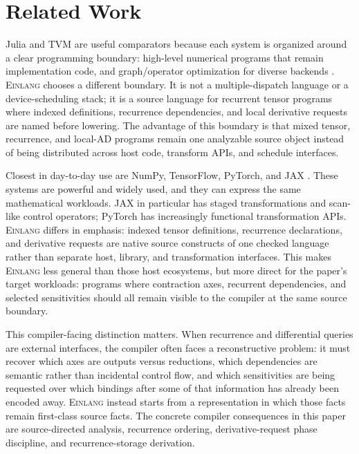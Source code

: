 \documentclass[sigplan,screen,nonacm]{acmart}
\newcommand{\einlang}{\textsc{Einlang}}
\begin{document}
\section{Related Work}

Julia and TVM are useful comparators because each system is organized around a clear programming boundary: high-level numerical programs that remain implementation code, and graph/operator optimization for diverse backends \cite{julia2017,tvm2018}. \einlang{} chooses a different boundary. It is not a multiple-dispatch language or a device-scheduling stack; it is a source language for recurrent tensor programs where indexed definitions, recurrence dependencies, and local derivative requests are named before lowering. The advantage of this boundary is that mixed tensor, recurrence, and local-AD programs remain one analyzable source object instead of being distributed across host code, transform APIs, and schedule interfaces.

Closest in day-to-day use are NumPy, TensorFlow, PyTorch, and JAX \cite{numpy2020,tensorflow2016,pytorch2019,jax2018}. These systems are powerful and widely used, and they can express the same mathematical workloads. JAX in particular has staged transformations and scan-like control operators; PyTorch has increasingly functional transformation APIs. \einlang{} differs in emphasis: indexed tensor definitions, recurrence declarations, and derivative requests are native source constructs of one checked language rather than separate host, library, and transformation interfaces. This makes \einlang{} less general than those host ecosystems, but more direct for the paper's target workloads: programs where contraction axes, recurrent dependencies, and selected sensitivities should all remain visible to the compiler at the same source boundary.

This compiler-facing distinction matters. When recurrence and differential queries are external interfaces, the compiler often faces a reconstructive problem: it must recover which axes are outputs versus reductions, which dependencies are semantic rather than incidental control flow, and which sensitivities are being requested over which bindings after some of that information has already been encoded away. \einlang{} instead starts from a representation in which those facts remain first-class source facts. The concrete compiler consequences in this paper are source-directed analysis, recurrence ordering, derivative-request phase discipline, and recurrence-storage derivation.
\end{document}
